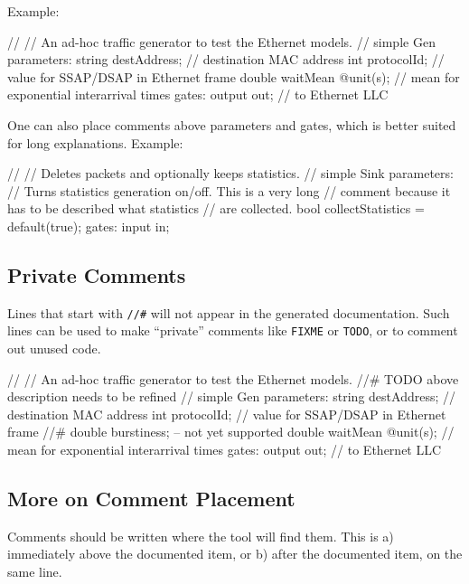 Example:

\begin{ned}
//
// An ad-hoc traffic generator to test the Ethernet models.
//
simple Gen
{
    parameters:
        string destAddress;  // destination MAC address
        int protocolId;      // value for SSAP/DSAP in Ethernet frame
        double waitMean @unit(s); // mean for exponential interarrival times
    gates:
        output out;  // to Ethernet LLC
}
\end{ned}

One can also place comments above parameters and gates, which is better
suited for long explanations. Example:

\begin{ned}
//
// Deletes packets and optionally keeps statistics.
//
simple Sink
{
    parameters:
        // Turns statistics generation on/off. This is a very long
        // comment because it has to be described what statistics
        // are collected.
        bool collectStatistics = default(true);
    gates:
        input in;
}
\end{ned}

\subsection{Private Comments}
\label{sec:neddoc:private-comments}

Lines that start with \texttt{//\#} will not appear in the generated
documentation. Such lines can be used to make ``private'' comments like
\texttt{FIXME} or \texttt{TODO}, or to comment out unused code.

\begin{ned}
//
// An ad-hoc traffic generator to test the Ethernet models.
//# TODO above description needs to be refined
//
simple Gen
{
    parameters:
        string destAddress;  // destination MAC address
        int protocolId;      // value for SSAP/DSAP in Ethernet frame
        //# double burstiness;  -- not yet supported
        double waitMean @unit(s); // mean for exponential interarrival times
    gates:
        output out;  // to Ethernet LLC
}
\end{ned}


\subsection{More on Comment Placement}
\label{sec:neddoc:comment-placement}

Comments should be written where the tool will find them.
This is a) immediately above the documented item, or b) after the
documented item, on the same line.

